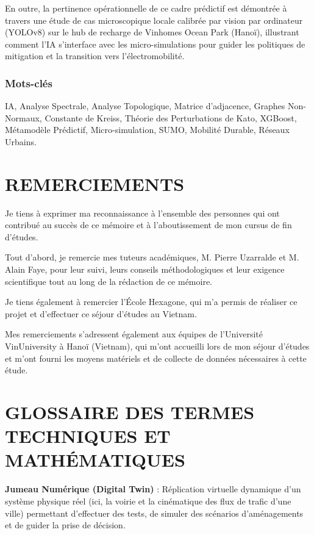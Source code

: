 \documentclass[10pt, a4paper]{article}
\begin{document}
En outre, la pertinence opérationnelle de ce cadre prédictif est
démontrée à travers une étude de cas microscopique locale calibrée par
vision par ordinateur (YOLOv8) sur le hub de recharge de Vinhomes Ocean
Park (Hanoï), illustrant comment l'IA s'interface avec les
micro-simulations pour guider les politiques de mitigation et la
transition vers l'électromobilité.

\subsubsection{Mots-clés}\label{mots-cluxe9s}

IA, Analyse Spectrale, Analyse Topologique, Matrice d'adjacence, Graphes
Non-Normaux, Constante de Kreiss, Théorie des Perturbations de Kato,
XGBoost, Métamodèle Prédictif, Micro-simulation, SUMO, Mobilité Durable,
Réseaux Urbains.

\newpage

\section{REMERCIEMENTS}\label{remerciements}

Je tiens à exprimer ma reconnaissance à l'ensemble des personnes qui ont
contribué au succès de ce mémoire et à l'aboutissement de mon cursus de
fin d'études.

Tout d'abord, je remercie mes tuteurs académiques, M. Pierre Uzarralde
et M. Alain Faye, pour leur suivi, leurs conseils méthodologiques et
leur exigence scientifique tout au long de la rédaction de ce mémoire.

Je tiens également à remercier l'École Hexagone, qui m'a permis de
réaliser ce projet et d'effectuer ce séjour d'études au Vietnam.

Mes remerciements s'adressent également aux équipes de l'Université
VinUniversity à Hanoï (Vietnam), qui m'ont accueilli lors de mon séjour
d'études et m'ont fourni les moyens matériels et de collecte de données
nécessaires à cette étude.

\newpage

\section{GLOSSAIRE DES TERMES TECHNIQUES ET
MATHÉMATIQUES}\label{glossaire-des-termes-techniques-et-mathuxe9matiques}

\textbf{Jumeau Numérique (Digital Twin)} : Réplication virtuelle
dynamique d'un système physique réel (ici, la voirie et la cinématique
des flux de trafic d'une ville) permettant d'effectuer des tests, de
simuler des scénarios d'aménagements et de guider la prise de décision.
\end{document}
